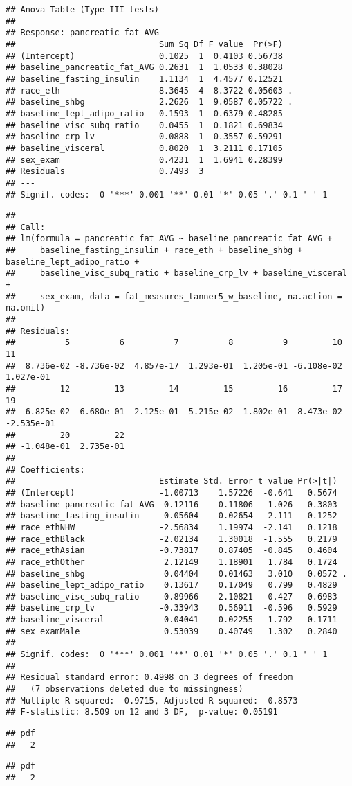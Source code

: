 \documentclass[
]{article}
\begin{document}
\begin{verbatim}
## Anova Table (Type III tests)
## 
## Response: pancreatic_fat_AVG
##                             Sum Sq Df F value  Pr(>F)  
## (Intercept)                 0.1025  1  0.4103 0.56738  
## baseline_pancreatic_fat_AVG 0.2631  1  1.0533 0.38028  
## baseline_fasting_insulin    1.1134  1  4.4577 0.12521  
## race_eth                    8.3645  4  8.3722 0.05603 .
## baseline_shbg               2.2626  1  9.0587 0.05722 .
## baseline_lept_adipo_ratio   0.1593  1  0.6379 0.48285  
## baseline_visc_subq_ratio    0.0455  1  0.1821 0.69834  
## baseline_crp_lv             0.0888  1  0.3557 0.59291  
## baseline_visceral           0.8020  1  3.2111 0.17105  
## sex_exam                    0.4231  1  1.6941 0.28399  
## Residuals                   0.7493  3                  
## ---
## Signif. codes:  0 '***' 0.001 '**' 0.01 '*' 0.05 '.' 0.1 ' ' 1
\end{verbatim}

\begin{verbatim}
## 
## Call:
## lm(formula = pancreatic_fat_AVG ~ baseline_pancreatic_fat_AVG + 
##     baseline_fasting_insulin + race_eth + baseline_shbg + baseline_lept_adipo_ratio + 
##     baseline_visc_subq_ratio + baseline_crp_lv + baseline_visceral + 
##     sex_exam, data = fat_measures_tanner5_w_baseline, na.action = na.omit)
## 
## Residuals:
##          5          6          7          8          9         10         11 
##  8.736e-02 -8.736e-02  4.857e-17  1.293e-01  1.205e-01 -6.108e-02  1.027e-01 
##         12         13         14         15         16         17         19 
## -6.825e-02 -6.680e-01  2.125e-01  5.215e-02  1.802e-01  8.473e-02 -2.535e-01 
##         20         22 
## -1.048e-01  2.735e-01 
## 
## Coefficients:
##                             Estimate Std. Error t value Pr(>|t|)  
## (Intercept)                 -1.00713    1.57226  -0.641   0.5674  
## baseline_pancreatic_fat_AVG  0.12116    0.11806   1.026   0.3803  
## baseline_fasting_insulin    -0.05604    0.02654  -2.111   0.1252  
## race_ethNHW                 -2.56834    1.19974  -2.141   0.1218  
## race_ethBlack               -2.02134    1.30018  -1.555   0.2179  
## race_ethAsian               -0.73817    0.87405  -0.845   0.4604  
## race_ethOther                2.12149    1.18901   1.784   0.1724  
## baseline_shbg                0.04404    0.01463   3.010   0.0572 .
## baseline_lept_adipo_ratio    0.13617    0.17049   0.799   0.4829  
## baseline_visc_subq_ratio     0.89966    2.10821   0.427   0.6983  
## baseline_crp_lv             -0.33943    0.56911  -0.596   0.5929  
## baseline_visceral            0.04041    0.02255   1.792   0.1711  
## sex_examMale                 0.53039    0.40749   1.302   0.2840  
## ---
## Signif. codes:  0 '***' 0.001 '**' 0.01 '*' 0.05 '.' 0.1 ' ' 1
## 
## Residual standard error: 0.4998 on 3 degrees of freedom
##   (7 observations deleted due to missingness)
## Multiple R-squared:  0.9715, Adjusted R-squared:  0.8573 
## F-statistic: 8.509 on 12 and 3 DF,  p-value: 0.05191
\end{verbatim}

\begin{verbatim}
## pdf 
##   2
\end{verbatim}

\begin{verbatim}
## pdf 
##   2
\end{verbatim}
\end{document}
